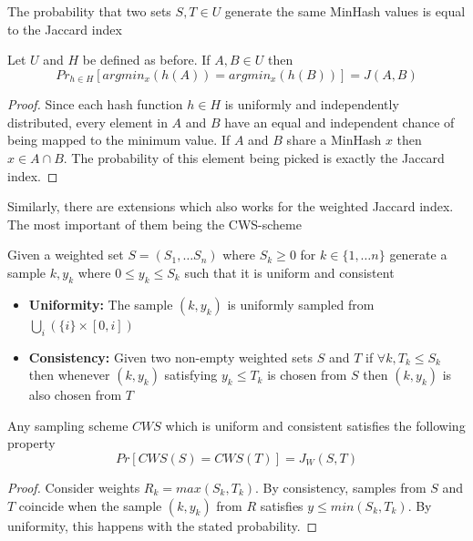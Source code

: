 \documentclass[../main.tex]{subfiles}
\begin{document}
The probability that two sets $S,T\in U$ generate the same MinHash values is equal to the Jaccard index 

\begin{theorem}
    Let $U$ and $H$ be defined as before. If $A,B\in U$ then  
    $$Pr_{h\in H}[argmin_x(h(A)) = argmin_x(h(B))] = J(A,B)$$
\end{theorem}
\begin{proof}
    Since each hash function $h\in H$ is uniformly and independently distributed, every element in $A$ and $B$ have an equal and independent chance of being mapped to the minimum value. If $A$ and $B$ share a MinHash $x$ then $x \in A \cap B$. The probability of this element being picked is exactly the Jaccard index.
\end{proof}

Similarly, there are extensions which also works for the weighted Jaccard index. The most important of them being the CWS-scheme
 
\begin{definition}
Given a weighted set $S = (S_1, \ldots S_n)$ where $S_k \geq 0$ for $k \in \{1,\ldots n\}$ generate a sample $k,y_k$ where $0 \leq y_k \leq S_k$ such that it is uniform and consistent

\begin{itemize}
    \item \textbf{Uniformity:} The sample $(k,y_k)$ is uniformly sampled from $\bigcup_i(\{i\}\times[0,i])$
    \item \textbf{Consistency:} 
    Given two non-empty weighted sets $S$ and $T$ if $\forall k, T_k \leq S_k$ then whenever $(k,y_k)$ satisfying $y_k \leq T_k$ is chosen from $S$ then $(k,y_k)$ is also chosen from $T$
\end{itemize}
\end{definition}

\begin{theorem}
    Any sampling scheme $CWS$ which is uniform and consistent satisfies the following property
    $$Pr[CWS(S) = CWS(T)] = J_W(S,T)$$
\end{theorem}
\begin{proof}
    Consider weights $R_k = max(S_k, T_k)$. By consistency, samples from $S$ and $T$ coincide when the sample $(k,y_k)$ from $R$ satisfies $y \leq min(S_k, T_k)$. By uniformity, this happens with the stated probability. 
\end{proof}
\end{document}
